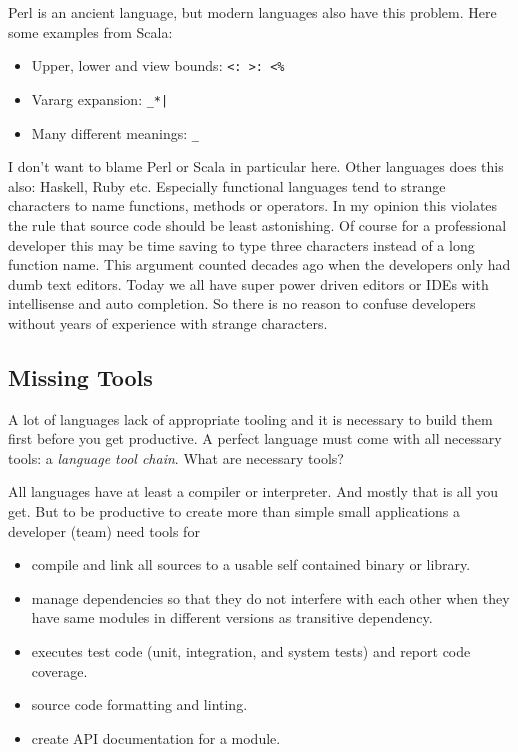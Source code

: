 \documentclass[11pt, a4paper]{report}
\begin{document}
Perl is an ancient language, but modern languages also have this problem. Here some examples from Scala\cite{special-operators-scala}:

\begin{itemize}
    \item Upper, lower and view bounds: \texttt{<: >: <\%}
    \item Vararg expansion: \texttt{\_*|}
    \item Many different meanings: \texttt{\_}
\end{itemize}

I don't want to blame Perl or Scala in particular here. Other languages does this also: Haskell, Ruby etc. Especially functional languages tend to strange characters to name functions, methods or operators. In my opinion this violates the rule that source code should be least astonishing. Of course for a professional developer this may be time saving to type three characters instead of a long function name. This argument counted decades ago when the developers only had dumb text editors. Today we all have super power driven editors or IDEs with intellisense and auto completion. So there is no reason to confuse developers without years of experience with strange characters.

\subsection{Missing Tools}

A lot of languages lack of appropriate tooling and it is necessary to build them first before you get productive. A perfect language must come with all necessary tools: a \textit{language tool chain}. What are necessary tools?

All languages have at least a compiler or interpreter. And mostly that is all you get. But to be productive to create more than simple small applications a developer (team) need tools for

\begin{itemize}
    \item compile and link all sources to a usable self contained binary or library.
    \item manage dependencies so that they do not interfere with each other when they have same modules in different versions as transitive dependency.
    \item executes test code (unit, integration, and system tests) and report code coverage.
    \item source code formatting and linting.
    \item create API documentation for a module.
\end{itemize}
\end{document}
